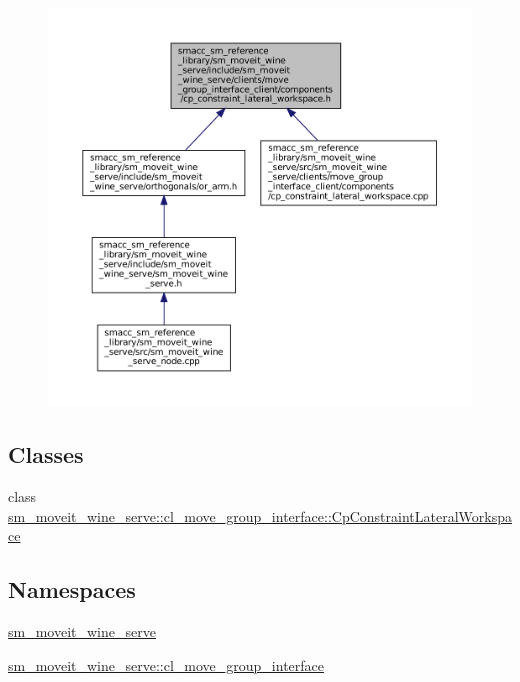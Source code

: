 \nopagebreak
\begin{figure}[H]
\begin{center}
\leavevmode
\includegraphics[width=350pt]{sm__moveit__wine__serve_2include_2sm__moveit__wine__serve_2clients_2move__group__interface__clieae309929b332c23089db82e937da39de}
\end{center}
\end{figure}
\subsection*{Classes}
\begin{DoxyCompactItemize}
\item 
class \hyperlink{classsm__moveit__wine__serve_1_1cl__move__group__interface_1_1CpConstraintLateralWorkspace}{sm\+\_\+moveit\+\_\+wine\+\_\+serve\+::cl\+\_\+move\+\_\+group\+\_\+interface\+::\+Cp\+Constraint\+Lateral\+Workspace}
\end{DoxyCompactItemize}
\subsection*{Namespaces}
\begin{DoxyCompactItemize}
\item 
 \hyperlink{namespacesm__moveit__wine__serve}{sm\+\_\+moveit\+\_\+wine\+\_\+serve}
\item 
 \hyperlink{namespacesm__moveit__wine__serve_1_1cl__move__group__interface}{sm\+\_\+moveit\+\_\+wine\+\_\+serve\+::cl\+\_\+move\+\_\+group\+\_\+interface}
\end{DoxyCompactItemize}
